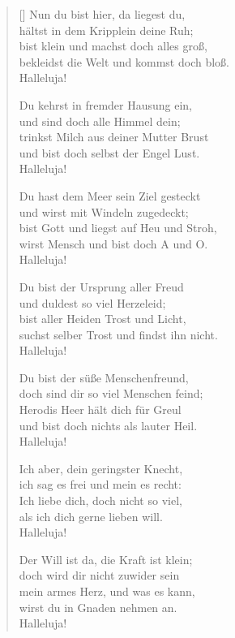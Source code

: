 \begin{multicols}{2}
\begin{verse}[\versewidth]
   Nun du bist hier, da liegest du,\\
  hältst in dem Kripplein deine Ruh;\\
  bist klein und machst doch alles groß,\\
  bekleidst die Welt und kommst doch bloß.\\
  Halleluja!
  
   Du kehrst in fremder Hausung ein,\\
  und sind doch alle Himmel dein;\\
  trinkst Milch aus deiner Mutter Brust\\
  und bist doch selbst der Engel Lust.\\
  Halleluja!

   Du hast dem Meer sein Ziel gesteckt\\
  und wirst mit Windeln zugedeckt;\\
  bist Gott und liegst auf Heu und Stroh,\\
  wirst Mensch und bist doch A und O.\\
  Halleluja!

   Du bist der Ursprung aller Freud\\
  und duldest so viel Herzeleid;\\
  bist aller Heiden Trost und Licht,\\
  suchst selber Trost und findst ihn nicht.\\
  Halleluja!

   Du bist der süße Menschenfreund,\\
  doch sind dir so viel Menschen feind;\\
  Herodis Heer hält dich für Greul\\
  und bist doch nichts als lauter Heil.\\
  Halleluja!

   Ich aber, dein geringster Knecht,\\
  ich sag es frei und mein es recht:\\
  Ich liebe dich, doch nicht so viel,\\
  als ich dich gerne lieben will.\\
  Halleluja!

   Der Will ist da, die Kraft ist klein;\\
  doch wird dir nicht zuwider sein\\
  mein armes Herz, und was es kann,\\
  wirst du in Gnaden nehmen an.\\
  Halleluja!


\end{verse}
\end{multicols}
